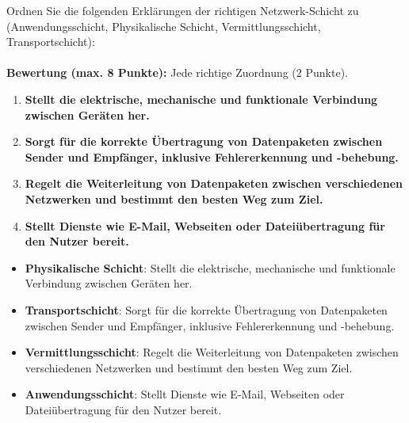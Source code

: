 \begin{myexercise}

    Ordnen Sie die folgenden Erklärungen der richtigen Netzwerk-Schicht zu (Anwendungsschicht, Physikalische Schicht, Vermittlungsschicht, Transportschicht):
    \\[.5cm]
    \\[.5cm]
    \textbf{Bewertung (max. 8 Punkte):} Jede richtige Zuordnung (2 Punkte).

    \begin{enumerate}
        \item \textbf{Stellt die elektrische, mechanische und funktionale Verbindung zwischen Geräten her.}
        \item \textbf{Sorgt für die korrekte Übertragung von Datenpaketen zwischen Sender und Empfänger, inklusive Fehlererkennung und -behebung.}
        \item \textbf{Regelt die Weiterleitung von Datenpaketen zwischen verschiedenen Netzwerken und bestimmt den besten Weg zum Ziel.}
        \item \textbf{Stellt Dienste wie E-Mail, Webseiten oder Dateiübertragung für den Nutzer bereit.}
    \end{enumerate}

    \begin{myanswer}
        \begin{itemize}
            \item \textbf{Physikalische Schicht}: Stellt die elektrische, mechanische und funktionale Verbindung zwischen Geräten her.
            \item \textbf{Transportschicht}: Sorgt für die korrekte Übertragung von Datenpaketen zwischen Sender und Empfänger, inklusive Fehlererkennung und -behebung.
            \item \textbf{Vermittlungsschicht}: Regelt die Weiterleitung von Datenpaketen zwischen verschiedenen Netzwerken und bestimmt den besten Weg zum Ziel.
            \item \textbf{Anwendungsschicht}: Stellt Dienste wie E-Mail, Webseiten oder Dateiübertragung für den Nutzer bereit.
        \end{itemize}
    \end{myanswer}
\end{myexercise}

